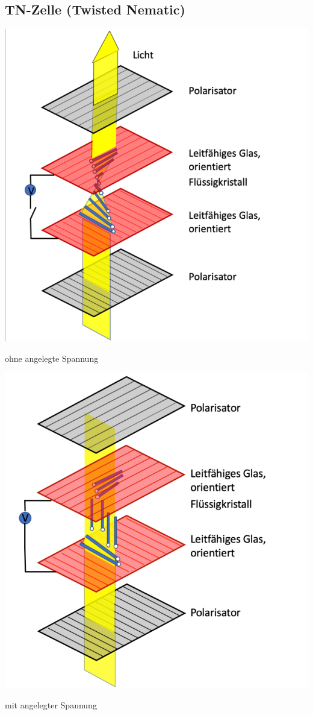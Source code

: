 \subsection{TN-Zelle (Twisted Nematic)}
\begin{minipage}{0.48\linewidth}
	\begin{center}
		\includegraphics[width=0.8\linewidth]{images/TN-Zelle1.png}
		
		ohne angelegte Spannung   
	\end{center}
\end{minipage}
\hfill
\begin{minipage}{0.48\linewidth}
	\begin{center}
		\includegraphics[width=0.8\linewidth]{images/TN-Zelle2.png} 
		
		mit angelegter Spannung 
	\end{center}
\end{minipage}
